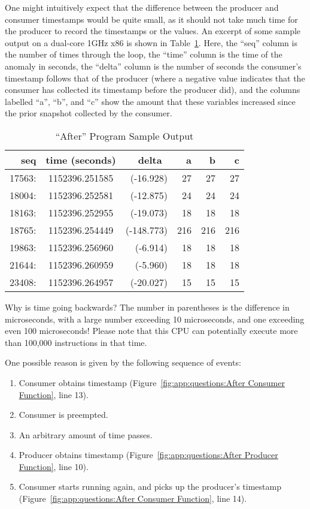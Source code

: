 One might intuitively expect that the difference between the producer
and consumer timestamps would be quite small, as it should not take
much time for the producer to record the timestamps or the values.
An excerpt of some sample output on a dual-core 1GHz x86 is shown in
Table~\ref{tab:app:questions:After Program Sample Output}.
Here, the ``seq'' column is the number of times through the loop,
the ``time'' column is the time of the anomaly in seconds, the ``delta''
column is the number of seconds the consumer's timestamp follows that
of the producer (where a negative value indicates that the consumer
has collected its timestamp before the producer did), and the
columns labelled ``a'', ``b'', and ``c'' show the amount that these
variables increased since the prior snapshot collected by the consumer.

\begin{table}[htbp]
\centering
\scriptsize
\begin{tabular}{rcrrrr}
seq    & time (seconds) & delta~    &  a &  b &  c \\
\hline
17563: & 1152396.251585 & (-16.928) & 27 & 27 & 27 \\
18004: & 1152396.252581 & (-12.875) & 24 & 24 & 24 \\
18163: & 1152396.252955 & (-19.073) & 18 & 18 & 18 \\
18765: & 1152396.254449 & (-148.773) & 216 & 216 & 216 \\
19863: & 1152396.256960 & (-6.914) & 18 & 18 & 18 \\
21644: & 1152396.260959 & (-5.960) & 18 & 18 & 18 \\
23408: & 1152396.264957 & (-20.027) & 15 & 15 & 15 \\
\end{tabular}
\caption{``After'' Program Sample Output}
\label{tab:app:questions:After Program Sample Output}
\end{table}

Why is time going backwards?
The number in parentheses is the difference in microseconds, with
a large number exceeding 10 microseconds, and one exceeding even
100 microseconds!
Please note that this CPU can potentially execute more than 100,000
instructions in that time.

One possible reason is given by the following sequence of events:
\begin{enumerate}
\item	Consumer obtains timestamp
	(Figure~\ref{fig:app:questions:After Consumer Function}, line 13).
\item	Consumer is preempted.
\item	An arbitrary amount of time passes.
\item	Producer obtains timestamp
	(Figure~\ref{fig:app:questions:After Producer Function}, line 10).
\item	Consumer starts running again, and picks up the producer's
	timestamp
	(Figure~\ref{fig:app:questions:After Consumer Function}, line 14).
\end{enumerate}

